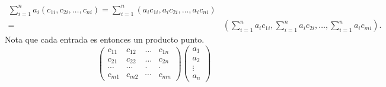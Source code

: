 \begin{itemize}
\begin{align*}
	\sum_{i=1}^{n} a_{i}(c_{1i}, c_{2i}, \ldots, c_{ni})
	= \sum_{i=1}^{n}(a_{i}c_{1i}, a_{i} c_{2i}, \ldots , a_{i}c_{ni})\\
	= & \left( \sum_{i=1}^{n} a_{i}c_{1i},
	\sum_{i=1}^{n} a_{i}c_{2i}, \ldots , 
	\sum_{i=1}^{n} a_{i}c_{mi}  \right).
	\end{align*}
	Nota que cada entrada es entonces un producto punto.
	\[
	\begin{pmatrix}
	c_{11} & c_{12} & \ldots & c_{1n} \\
	c_{21} & c_{22} & \ldots & c_{2n} \\
	\cdots & \cdots & \cdot & \cdot \\
	c_{m1} & c_{m2} & \cdots & c_{mn}
	\end{pmatrix}
	\begin{pmatrix}
	a_{1} \\ a_{2} \\ \vdots \\ a_{n}
	\end{pmatrix}
	\]
\end{itemize}

\newpage
